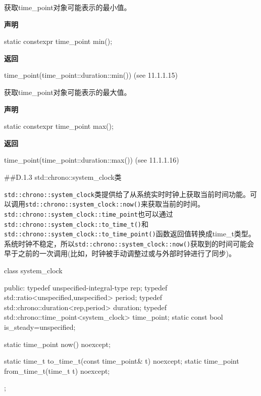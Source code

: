 获取time\_point对象可能表示的最小值。

\textbf{声明}

\begin{cpp}
static constexpr time_point min();
\end{cpp}

\textbf{返回}

\begin{cpp}
time_point(time_point::duration::min()) (see 11.1.1.15)
\end{cpp}


获取time\_point对象可能表示的最大值。

\textbf{声明}

\begin{cpp}
static constexpr time_point max();
\end{cpp}

\textbf{返回}

\begin{cpp}
time_point(time_point::duration::max()) (see 11.1.1.16)
\end{cpp}

##D.1.3 std::chrono::system\_clock类

\texttt{std::chrono::system\_clock}类提供给了从系统实时时钟上获取当前时间功能。可以调用\texttt{std::chrono::system\_clock::now()}来获取当前的时间。\texttt{std::chrono::system\_clock::time\_point}也可以通过\texttt{std::chrono::system\_clock::to\_time\_t()}和\texttt{std::chrono::system\_clock::to\_time\_point()}函数返回值转换成time\_t类型。系统时钟不稳定，所以\texttt{std::chrono::system\_clock::now()}获取到的时间可能会早于之前的一次调用(比如，时钟被手动调整过或与外部时钟进行了同步)。


\begin{cpp}
class system_clock
{
public:
  typedef unspecified-integral-type rep;
  typedef std::ratio<unspecified,unspecified> period;
  typedef std::chrono::duration<rep,period> duration;
  typedef std::chrono::time_point<system_clock> time_point;
  static const bool is_steady=unspecified;

  static time_point now() noexcept;

  static time_t to_time_t(const time_point& t) noexcept;
  static time_point from_time_t(time_t t) noexcept;
};
\end{cpp}


